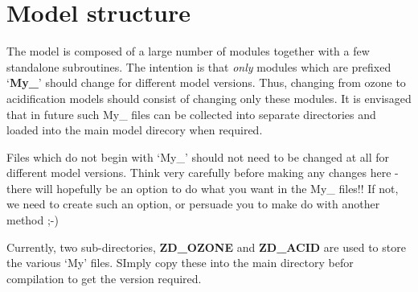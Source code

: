 \chapter{Model structure}

The model is composed of a large number of modules together with a few
standalone subroutines. The intention is that \emph{only}
modules which are prefixed `{\bf My\_}'  should change for different
model versions. Thus, changing from ozone to acidification models
should consist of changing only these modules. It is envisaged that
in future such My\_ files can be collected into separate directories
and loaded into the main model direcory when required.

Files which do not begin with `My\_' should not need to be changed
at all for different model versions. Think very carefully before
making any changes here - there will hopefully be an option to
do what you want  in the My\_ files!! If not, we need to create
such an option, or persuade you to make do with another method ;-)


Currently, two sub-directories, {\bf ZD\_OZONE} and {\bf ZD\_ACID}
are used to store the various `My' files. SImply copy these
into the main directory befor compilation to get the version required.

